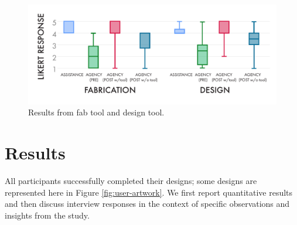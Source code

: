 \documentclass{sigchi}
\begin{document}
\begin{figure}[t]
\centering
\includegraphics[width=1.0\columnwidth]{charts/boxplots_quant.pdf}
\caption{Results from fab tool and design tool. }
\label{fig:fab_tool_results}
\end{figure}

\section{Results}


All participants successfully completed their designs; some designs are represented here in Figure \ref{fig:user-artwork}. 
We first report quantitative results and then discuss interview responses in the context of specific observations and insights from the study.
\end{document}
